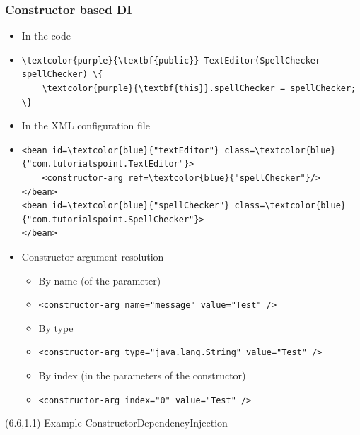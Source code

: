 \documentclass[10pt,xcolor=pdflatex, table]{beamer}
\begin{document}
\begin{frame}[fragile]\frametitle{Constructor based DI}
	\begin{itemize}
		\item In the code
        \item[]
            \begin{Verbatim}[fontsize=\footnotesize, commandchars=\\\{\}]
\textcolor{purple}{\textbf{public}} TextEditor(SpellChecker spellChecker) \{
    \textcolor{purple}{\textbf{this}}.spellChecker = spellChecker;
\}
            \end{Verbatim}
        \item In the XML configuration file
        \item[]
            \begin{Verbatim}[fontsize=\footnotesize, commandchars=\\\{\}]
<bean id=\textcolor{blue}{"textEditor"} class=\textcolor{blue}{"com.tutorialspoint.TextEditor"}>
    <constructor-arg ref=\textcolor{blue}{"spellChecker"}/>
</bean>
<bean id=\textcolor{blue}{"spellChecker"} class=\textcolor{blue}{"com.tutorialspoint.SpellChecker"}>
</bean>
            \end{Verbatim}
        \item Constructor argument resolution
          \begin{itemize}
        	\item By name (of the parameter)
            \item[] {\footnotesize \texttt{<constructor-arg name="message"\ value="Test" />}}
        	\item By type
            \item[] {\footnotesize \texttt{<constructor-arg type="java.lang.String"\ value="Test" />}}
        	\item By index (in the parameters of the constructor)
            \item[] {\footnotesize \texttt{<constructor-arg index="0"\ value="Test" />}}
          \end{itemize}
	\end{itemize}
\begin{textblock}{15}(6.6,1.1)
    {\footnotesize Example ConstructorDependencyInjection}
\end{textblock}
\end{frame}
\end{document}
